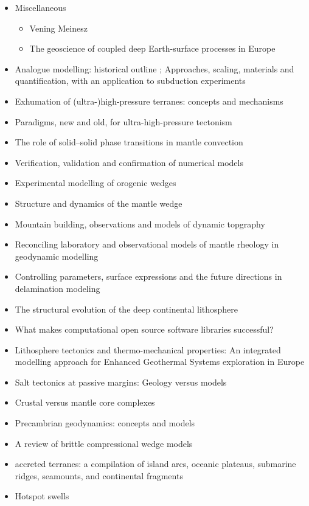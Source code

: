\begin{itemize}
\item Miscellaneous
   \begin{itemize}
   \item Vening Meinesz \cite{vlaa89}
   \item The geoscience of coupled deep Earth-surface processes in Europe \cite{clzb07}
   \end{itemize}


\item Analogue modelling: historical outline \cite{koyi97}; Approaches, scaling, materials and quantification, with an application to subduction experiments \cite{scst16}
\item Exhumation of (ultra-)high-pressure terranes: concepts and mechanisms \cite{warr13}
\item Paradigms, new and old, for ultra-high-pressure tectonism \cite{hage13}
\item The role of solid–solid phase transitions in mantle convection \cite{fada17}
\item Verification, validation and confirmation of numerical models \cite{orsb94}
\item Experimental modelling of orogenic wedges \cite{grmd12}
\item Structure and dynamics of the mantle wedge \cite{vank03}
\item Mountain building, observations and models of dynamic topgraphy \cite{flgm13,fabc13}
\item Reconciling laboratory and observational models of mantle rheology in geodynamic modelling \cite{king16}
\item Controlling parameters, surface expressions and the future directions in delamination modeling \cite{goue18}
\item The structural evolution of the deep continental lithosphere \cite{comm17}
\item What makes computational open source software libraries successful? \cite{bahe13}
\item Lithosphere tectonics and thermo-mechanical properties: An integrated modelling
approach for Enhanced Geothermal Systems exploration in Europe \cite{clvz10}
\item Salt tectonics at passive margins: Geology versus models \cite{brfo11}
\item Crustal versus mantle core complexes \cite{brst18}
\item Precambrian geodynamics: concepts and models \cite{gery14}
\item A review of brittle compressional wedge models \cite{buit12}
\item accreted terranes: a compilation of island arcs, oceanic
      plateaus, submarine ridges, seamounts, and continental fragments \cite{tebu14}
\item Hotspot swells \cite{kiad14}
\end{itemize}

